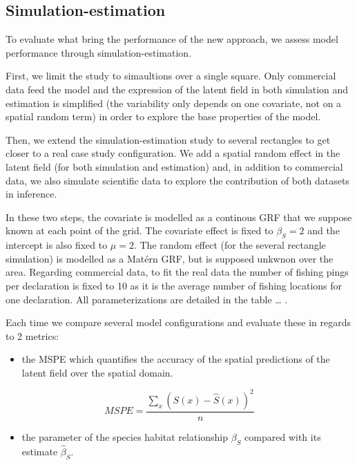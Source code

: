 \documentclass[
  english,
  man]{apa6}
\providecommand{\tightlist}{%
  \setlength{\itemsep}{0pt}\setlength{\parskip}{0pt}}
\begin{document}
\hypertarget{simulation-estimation}{%
\subsection{Simulation-estimation}\label{simulation-estimation}}

To evaluate what bring the performance of the new approach, we assess model performance through simulation-estimation.

First, we limit the study to simaultions over a single square. Only commercial data feed the model and the expression of the latent field in both simulation and estimation is simplified (the variability only depends on one covariate, not on a spatial random term) in order to explore the base properties of the model.

Then, we extend the simulation-estimation study to several rectangles to get closer to a real case study configuration. We add a spatial random effect in the latent field (for both simulation and estimation) and, in addition to commercial data, we also simulate scientific data to explore the contribution of both datasets in inference.

In these two steps, the covariate is modelled as a continous GRF that we suppose known at each point of the grid. The covariate effect is fixed to \(\beta_S=2\) and the intercept is also fixed to \(\mu=2\). The random effect (for the several rectangle simulation) is modelled as a Matérn GRF, but is supposed unkwnon over the area. Regarding commercial data, to fit the real data the number of fishing pings per declaration is fixed to 10 as it is the average number of fishing locations for one declaration. All parameterizations are detailed in the table \ldots{} .

Each time we compare several model configurations and evaluate these in regards to 2 metrics:

\begin{itemize}
\tightlist
\item
  the MSPE which quantifies the accuracy of the spatial predictions of the latent field over the spatial domain.
\end{itemize}

\[MSPE=\frac{\sum_x (S(x) - \hat{S}(x) ) ^2}{n}\]

\begin{itemize}
\tightlist
\item
  the parameter of the species habitat relationship \(\beta_S\) compared with its estimate \(\hat \beta_S\).
\end{itemize}
\end{document}
